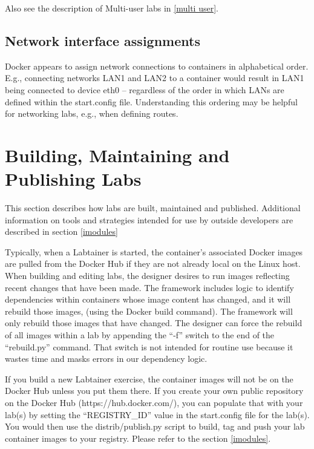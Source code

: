 \documentclass[12pt]{article}
\begin{document}
Also see the description of Multi-user labs in \ref{multi user}.

\subsection{Network interface assignments}
Docker appears to assign network connections to containers in alphabetical order.  E.g., connecting
networks LAN1 and LAN2 to a container would result in LAN1 being connected to device eth0 -- regardless
of the order in which LANs are defined within the start.config file.  Understanding this ordering may
be helpful for networking labs, e.g., when defining routes.

\section{Building, Maintaining and Publishing Labs} \label{publishing}
This section describes how labs are built, maintained and published.  Additional information
on tools and strategies intended for use by outside developers are described in section \ref{imodules}

Typically, when a Labtainer is started, the container's associated Docker images are pulled from
the Docker Hub if they are not already local on the Linux host.  When building and editing labs,
the designer desires to run images reflecting recent changes that have been made.  The framework
includes logic to identify dependencies within containers whose image content has changed, 
and it will rebuild those images, (using the Docker build command).  The framework will only 
rebuild those images that have changed.  The designer can force the rebuild of all images within
a lab by appending the ``-f'' switch to the end of the ``rebuild.py'' command.  That switch is not
intended for routine use because it wastes time and masks errors in our dependency logic.

If you build a new Labtainer exercise, the container images will not be on the Docker Hub unless you put
them there.  If you
create your own public repository on the Docker Hub (https://hub.docker.com/), you can populate that
with your lab(s) by setting the ``REGISTRY\_ID'' value in the start.config file for the lab(s). You
would then use the distrib/publish.py script to build, tag and push your lab container images to your registry.
Please refer to the section \ref{imodules}.
\end{document}
